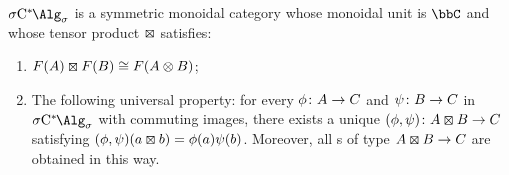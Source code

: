 \begin{theorem}\label{thm:tensor_shom}
	$\SigmaC$ is a symmetric monoidal category whose monoidal unit is $\bbC$ and whose tensor product $\kocktensor$ satisfies:
	\begin{enumerate}
		\item\label{it:free_algebras} $F(\A)\kocktensor F(\B)\cong F(\A\otimes \B)$;
		\item\label{it:universal_prop} The following universal property:
		      for every $\phi \colon {A} \to {C}$ and $\psi\colon {B} \to {C}$ in $\SigmaC$ with commuting images, there exists a unique $(\phi,\psi)\colon \A \kocktensor \B \to \C$ satisfying $(\phi,\psi)(a\kocktensor b) = \phi(a)\psi(b)$.
		      Moreover, all \starshom{}s of type $\A \kocktensor \B \to \C$ are obtained in this way.
	\end{enumerate}
\end{theorem}
